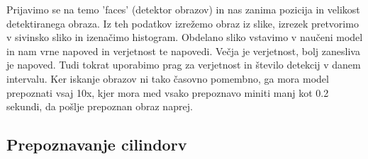 \documentclass{llncs}
\begin{document}
Prijavimo se na temo 'faces' (detektor obrazov) in nas zanima pozicija in velikost detektiranega obraza. Iz teh podatkov izrežemo obraz iz slike, izrezek pretvorimo v sivinsko sliko in izenačimo histogram. Obdelano sliko vstavimo v naučeni model in nam vrne napoved in verjetnost te napovedi. Večja je verjetnost, bolj zanesliva je napoved. Tudi tokrat uporabimo prag za verjetnost in število detekcij v danem intervalu. Ker iskanje obrazov ni tako časovno pomembno, ga mora model prepoznati vsaj 10x, kjer mora med vsako prepoznavo miniti manj kot 0.2 sekundi, da pošlje prepoznan obraz naprej. 


\subsection{Prepoznavanje cilindorv}
\end{document}
